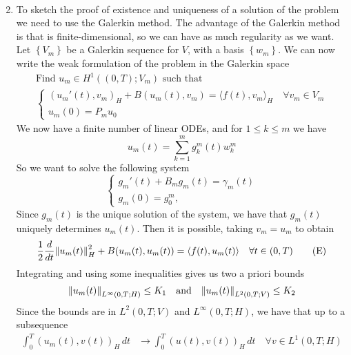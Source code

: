 \begin{enumerate}
\[\begin{split}
              \end{split}
          \]
    \item To sketch the proof of existence and uniqueness of a solution of the problem we
          need to use the Galerkin method. The advantage of the Galerkin method is that
          is finite-dimensional, so we can have as much regularity as we want. Let
          \(\left\{V_m\right\}\) be a Galerkin sequence for \(V\), with a basis
          \(\left\{w_m \right\}\). We can now write the weak formulation of the problem
          in the Galerkin space
          \[
              \begin{split}
                  \text{Find } u_m \in H^1((0, T); V_m) \text{ such that } \\
                  \begin{cases}
                      \left(u_m'(t), v_m\right)_H + B(u_m(t), v_m) = \langle f(t), v_m \rangle_H  \quad \forall v_m \in V_m \\
                      u_m(0) = P_m u_0
                  \end{cases}
              \end{split}
          \]
          We now have a finite number of linear ODEs, and for \(1 \leq k \leq m\) we have
          \[
              u_m(t) = \sum_{k=1}^m g_k^m(t) w_k^m
          \]
          So we want to solve the following system
          \[
              \begin{cases}
                  g_m'(t) + B_m g_m(t) = \gamma_m(t) \\
                  g_m(0) = g_0^m,
              \end{cases}
          \]
          Since \(g_m(t)\) is the unique solution of the system, we have that \(g_m(t)\)
          uniquely determines \(u_m(t)\). Then it is possible, taking \(v_m = u_m\) to
          obtain
          \[
              \frac{1}{2}\frac{d}{dt}\norm{u_m(t)}_H^2 + B(u_m(t), u_m(t)) = \langle f(t), u_m(t) \rangle \quad \forall t \in (0, T)
              \tag*{(E)}
          \]
          Integrating and using some inequalities gives us two a priori bounds
          \[
              \norm{u_m(t)}_{L^\infty(0, T; H)} \leq K_1 \quad \text{and} \quad \norm{u_m(t)}_{L^2(0, T; V)} \leq K_2
          \]
          Since the bounds are in \(L^2(0, T; V)\) and \(L^\infty(0, T; H)\), we have
          that up to a subsequence
          \begin{align*}
              \int_0^T \left(u_m(t), v(t)\right)_H \, dt & \to \int_0^T \left(u(t), v(t)\right)_H \, dt \quad \forall v \in L^1(0, T; H) \\

\end{align*}
\end{enumerate}
